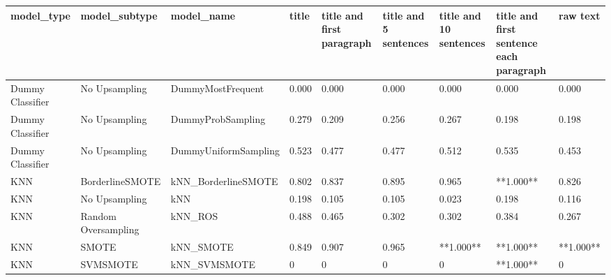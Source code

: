 \begin{tabular}{lllllllll}
\toprule
                  model\_type &       model\_subtype &                                   model\_name & title & title and first paragraph & title and 5 sentences & title and 10 sentences & title and first sentence each paragraph &  raw text \\
\midrule
            Dummy Classifier &       No Upsampling &                            DummyMostFrequent & 0.000 &                     0.000 &                 0.000 &                  0.000 &                                   0.000 &     0.000 \\
            Dummy Classifier &       No Upsampling &                            DummyProbSampling & 0.279 &                     0.209 &                 0.256 &                  0.267 &                                   0.198 &     0.198 \\
            Dummy Classifier &       No Upsampling &                         DummyUniformSampling & 0.523 &                     0.477 &                 0.477 &                  0.512 &                                   0.535 &     0.453 \\
                         KNN &     BorderlineSMOTE &                          kNN\_BorderlineSMOTE & 0.802 &                     0.837 &                 0.895 &                  0.965 &                               **1.000** &     0.826 \\
                         KNN &       No Upsampling &                                          kNN & 0.198 &                     0.105 &                 0.105 &                  0.023 &                                   0.198 &     0.116 \\
                         KNN & Random Oversampling &                                      kNN\_ROS & 0.488 &                     0.465 &                 0.302 &                  0.302 &                                   0.384 &     0.267 \\
                         KNN &               SMOTE &                                    kNN\_SMOTE & 0.849 &                     0.907 &                 0.965 &              **1.000** &                               **1.000** & **1.000** \\
                         KNN &            SVMSMOTE &                                 kNN\_SVMSMOTE &     0 &                         0 &                     0 &                      0 &                               **1.000** &         0 \\

\end{tabular}
